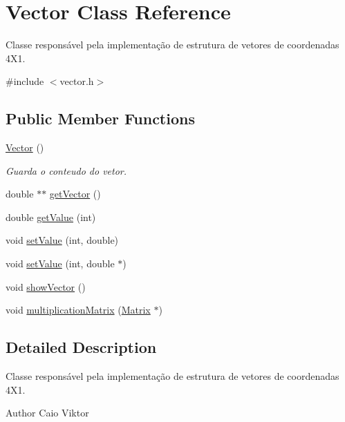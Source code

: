 \hypertarget{class_vector}{\section{Vector Class Reference}
\label{class_vector}
}


Classe responsável pela implementação de estrutura de vetores de coordenadas 4\-X1.  




{\ttfamily \#include $<$vector.\-h$>$}

\subsection*{Public Member Functions}
\begin{DoxyCompactItemize}
\item 
\hyperlink{class_vector_a6f80c73b5f18dcf3f8e36065bdc8b9e5}{Vector} ()
\begin{DoxyCompactList}\small\item\em Guarda o conteudo do vetor. \end{DoxyCompactList}\item 
double $\ast$$\ast$ \hyperlink{class_vector_ac6923cc4d752c3f6ba3e41d78cba14ac}{get\-Vector} ()
\item 
double \hyperlink{class_vector_a0b1f030faadf671092504286e70b4df0}{get\-Value} (int)
\item 
void \hyperlink{class_vector_ad6c93a7d6b992f46d0118f33cfc41f88}{set\-Value} (int, double)
\item 
void \hyperlink{class_vector_a8390359b5276e9601d3185f6fb9b2e20}{set\-Value} (int, double $\ast$)
\item 
void \hyperlink{class_vector_aaf16ef229369a72edf34bc91136642cd}{show\-Vector} ()
\item 
void \hyperlink{class_vector_a6db126151d0311e2fa09b39415963cea}{multiplication\-Matrix} (\hyperlink{class_matrix}{Matrix} $\ast$)
\end{DoxyCompactItemize}


\subsection{Detailed Description}
Classe responsável pela implementação de estrutura de vetores de coordenadas 4\-X1. 

\begin{DoxyAuthor}{Author}
Caio Viktor 
\end{DoxyAuthor}


